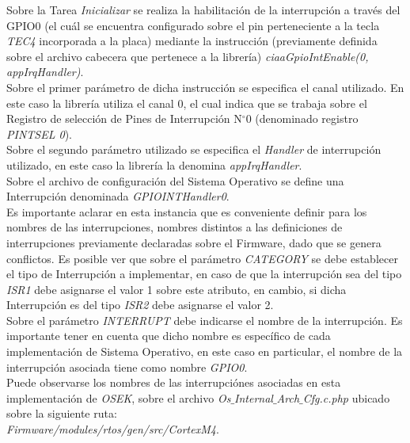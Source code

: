 \documentclass[12pt,letterpaper]{article}
\begin{document}
Sobre la Tarea \textit{Inicializar} se realiza la habilitación de la interrupción a través del GPIO0 (el cuál se encuentra configurado sobre el pin perteneciente a la tecla \textit{TEC4} incorporada a la placa) mediante la instrucción (previamente definida sobre el archivo cabecera que pertenece a la librería) \textit{ciaaGpioIntEnable(0, appIrqHandler)}.
 \\
 
Sobre el primer parámetro de dicha instrucción se especifica el canal utilizado. En este caso la librería utiliza el canal 0, el cual indica que se trabaja sobre el Registro de selección de Pines de Interrupción N$^{\circ}$0 (denominado registro \textit{PINTSEL 0}).
 \\
 
Sobre el segundo parámetro utilizado se especifica el \textit{Handler} de interrupción utilizado, en este caso la librería la denomina \textit{appIrqHandler}.
 \\
 
Sobre el archivo de configuración del Sistema Operativo se define una Interrupción denominada \textit{GPIOINTHandler0}.
 \\
 
Es importante aclarar en esta instancia que es conveniente definir para los nombres de las interrupciones, nombres distintos a las definiciones de interrupciones previamente declaradas sobre el Firmware, dado que se genera conflictos. Es posible ver que sobre el parámetro \textit{CATEGORY} se debe establecer el tipo de Interrupción a implementar, en caso de que la interrupción sea del tipo \textit{ISR1} debe asignarse el valor 1 sobre este atributo, en cambio, si dicha Interrupción es del tipo \textit{ISR2} debe asignarse el valor 2.
 \\
 
Sobre el parámetro \textit{INTERRUPT} debe indicarse el nombre de la interrupción. Es importante tener en cuenta que dicho nombre es específico de cada implementación de Sistema Operativo, en este caso en particular, el nombre de la interrupción asociada tiene como nombre \textit{GPIO0}.
 \\
 
Puede observarse los nombres de las interrupciónes asociadas en esta implementación de \textit{OSEK}, sobre el archivo \textit{Os$\_$Internal$\_$Arch$\_$Cfg.c.php} ubicado sobre la siguiente ruta:
 \\
 
\textit{Firmware/modules/rtos/gen/src/CortexM4}.
 \\
 
\end{document}

